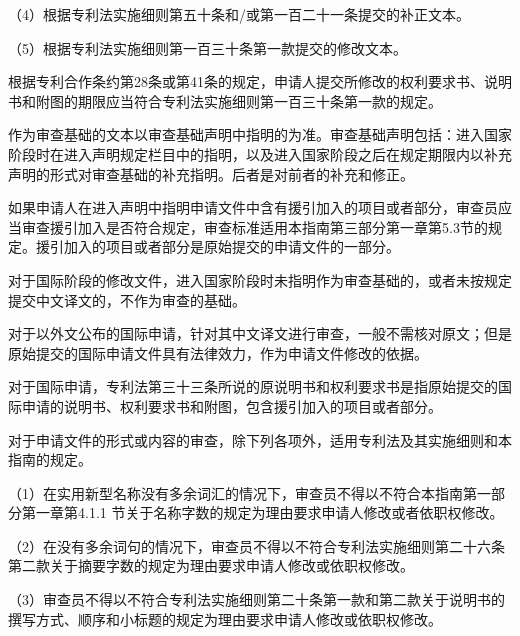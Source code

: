 {\setlength{\parindent}{17.1bp}（4）根据专利法实施细则第五十条和/或第一百二十一条提交的补正文本。\par}

{\setlength{\parindent}{17.1bp}（5）根据专利法实施细则第一百三十条第一款提交的修改文本。\par}

根据专利合作条约第28条或第41条的规定，申请人提交所修改的权利要求书、说明书和附图的期限应当符合专利法实施细则第一百三十条第一款的规定。

作为审查基础的文本以审查基础声明中指明的为准。审查基础声明包括：进入国家阶段时在进入声明规定栏目中的指明，以及进入国家阶段之后在规定期限内以补充声明的形式对审查基础的补充指明。后者是对前者的补充和修正。

如果申请人在进入声明中指明申请文件中含有援引加入的项目或者部分，审查员应当审查援引加入是否符合规定，审查标准适用本指南第三部分第一章第5.3节的规定。援引加入的项目或者部分是原始提交的申请文件的一部分。

对于国际阶段的修改文件，进入国家阶段时未指明作为审查基础的，或者未按规定提交中文译文的，不作为审查的基础。

对于以外文公布的国际申请，针对其中文译文进行审查，一般不需核对原文；但是原始提交的国际申请文件具有法律效力，作为申请文件修改的依据。

对于国际申请，专利法第三十三条所说的原说明书和权利要求书是指原始提交的国际申请的说明书、权利要求书和附图，包含援引加入的项目或者部分。

对于申请文件的形式或内容的审查，除下列各项外，适用专利法及其实施细则和本指南的规定。

{\setlength{\parindent}{17.1bp}（1）在实用新型名称没有多余词汇的情况下，审查员不得以不符合本指南第一部分第一章第4.1.1 节关于名称字数的规定为理由要求申请人修改或者依职权修改。\par}

{\setlength{\parindent}{17.1bp}（2）在没有多余词句的情况下，审查员不得以不符合专利法实施细则第二十六条第二款关于摘要字数的规定为理由要求申请人修改或依职权修改。\par}

{\setlength{\parindent}{17.1bp}（3）审查员不得以不符合专利法实施细则第二十条第一款和第二款关于说明书的撰写方式、顺序和小标题的规定为理由要求申请人修改或依职权修改。\par}

